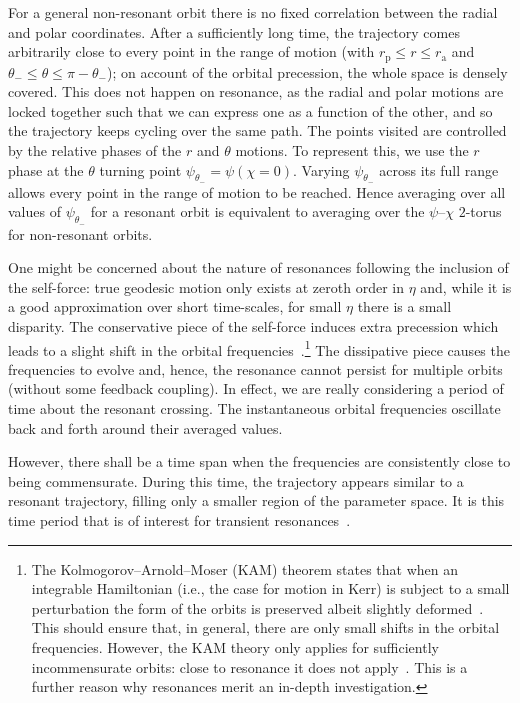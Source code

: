\documentclass[aps,prd,amsfonts,amssymb,amsmath,nofootinbib,reprint,showpacs]{revtex4}
\newcommand{\sub}[1]{\ensuremath{_\text{#1}}}
\begin{document}
For a general non-resonant orbit there is no fixed correlation between the radial and polar coordinates. After a sufficiently long time, the trajectory comes arbitrarily close to every point in the range of motion (with $r\sub{p} \leq r \leq r\sub{a}$ and $\theta_- \leq \theta \leq \pi - \theta_-$); on account of the orbital precession, the whole space is densely covered. This does not happen on resonance, as the radial and polar motions are locked together such that we can express one as a function of the other, and so the trajectory keeps cycling over the same path. The points visited are controlled by the relative phases of the $r$ and $\theta$ motions. To represent this, we use the $r$ phase at the $\theta$ turning point $\psi_{\theta_-} = \psi(\chi = 0)$. Varying $\psi_{\theta_-}$ across its full range allows every point in the range of motion to be reached. Hence averaging over all values of $\psi_{\theta_-}$ for a resonant orbit is equivalent to averaging over the $\psi$--$\chi$ $2$-torus for non-resonant orbits.

One might be concerned about the nature of resonances following the inclusion of the self-force: true geodesic motion only exists at zeroth order in $\eta$ and, while it is a good approximation over short time-scales, for small $\eta$ there is a small disparity. The conservative piece of the self-force induces extra precession which leads to a slight shift in the orbital frequencies~\cite{Warburton2012}.\footnote{The Kolmogorov--Arnold--Moser (KAM) theorem states that when an integrable Hamiltonian (i.e., the case for motion in Kerr) is subject to a small perturbation the form of the orbits is preserved albeit slightly deformed~\cite{Arnold1963,Moser1973}. %
This should ensure that, in general, there are only small shifts in the orbital frequencies. However, the KAM theory only applies for sufficiently incommensurate orbits: close to resonance it does not apply~\cite{Moser1973}. %
This is a further reason why resonances merit an in-depth investigation.}
The dissipative piece causes the frequencies to evolve and, hence, the resonance cannot persist for multiple orbits (without some feedback coupling). In effect, we are really considering a period of time about the resonant crossing. The instantaneous orbital frequencies oscillate back and forth around their averaged values.

However, there shall be a time span when the frequencies are consistently close to being commensurate. During this time, the trajectory appears similar to a resonant trajectory, filling only a smaller region of the parameter space. It is this time period that is of interest for transient resonances~\cite{Bosley1992}.
\end{document}
